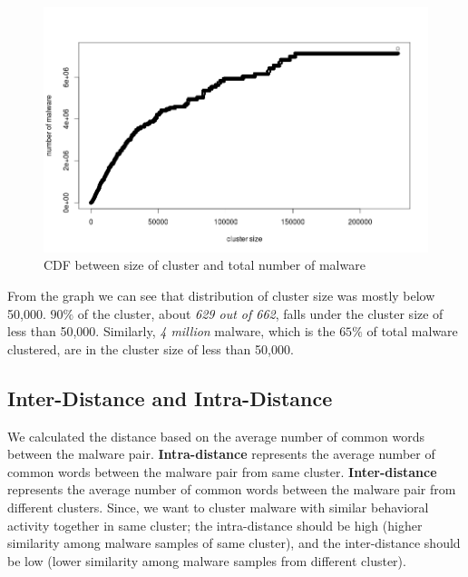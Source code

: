 \begin{figure}[htbp]
\begin{center}
  \includegraphics[scale=0.3]{figures/cdfclusterlen2.png}
\end{center}
\caption{CDF between size of cluster and total number of malware}
\label{fig:cdfclusterlen}
\end{figure}
From the graph we can see that distribution of cluster size was mostly below 50,000.
$90\%$ of the cluster, about \emph{629 out of 662}, falls under the cluster size of less than 50,000.
Similarly, \emph{4 million} malware, which is the $65\%$ of total malware clustered, are in the cluster size of less than 50,000.\\
\subsection{Inter-Distance and Intra-Distance}
\label{sub:Inter-Distance and Intra-Distance}
We calculated the distance based on the average number of common words between the malware pair.
\textbf{Intra-distance} represents the average number of common words between the malware pair from same cluster.
\textbf{Inter-distance} represents the average number of common words between the malware pair from different clusters.
Since, we want to cluster malware with similar behavioral activity together in same cluster; the intra-distance should be high (higher similarity among malware samples of same cluster), and the inter-distance should be low (lower similarity among malware samples from different cluster).
\\

